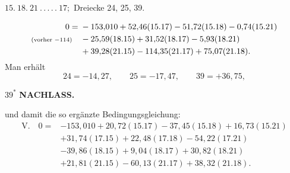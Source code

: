 \par\bigskip
\begin{center}
$15.\ 18.\ 21\ .\,.\,.\,.\,.\ 17;$ Dreiecke 24, 25, 39.
\end{center}
\[
\begin{aligned}
0={}&-153{,}010+52{,}46(15.17)-51{,}72(15.18)-0{,}74(15.21)\\
\text{\scriptsize(vorher $-114$)}\quad&-25{,}59(18.15)+31{,}52(18.17)-5{,}93(18.21)\\
&+39{,}28(21.15)-114{,}35(21.17)+75{,}07(21.18).
\end{aligned}
\]
Man erhält
\[
24=-14{,}27,\qquad25=-17{,}47,\qquad39=+36{,}75,
\]
\par\smallskip\noindent\hfill$39^\ast$
\newpage
{}\hfill\textbf{NACHLASS.}\par\medskip
\noindent und damit die so ergänzte Bedingungsgleichung:
\[
\begin{aligned}
\mathrm{V.}\quad0={}&-153{,}010+20{,}72(15.17)-37{,}45(15.18)+16{,}73(15.21)\\
&+31{,}74(17.15)+22{,}48(17.18)-54{,}22(17.21)\\
&-39{,}86(18.15)+9{,}04(18.17)+30{,}82(18.21)\\
&+21{,}81(21.15)-60{,}13(21.17)+38{,}32(21.18).
\end{aligned}
\]

